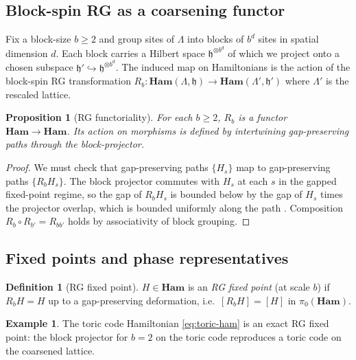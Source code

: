 \documentclass[12pt]{article}
\theoremstyle{plain}
\newtheorem{proposition}[theorem]{Proposition}
\theoremstyle{definition}
\newtheorem{definition}[theorem]{Definition}
\newtheorem{example}[theorem]{Example}
\theoremstyle{remark}
\newcommand{\Ham}{\mathbf{Ham}}
\begin{document}
\subsection{Block-spin RG as a coarsening functor}

Fix a block-size $b\geq 2$ and group sites of $\Lambda$ into blocks of $b^{d}$ sites in
spatial dimension $d$. Each block carries a Hilbert space $\mathfrak{h}^{\otimes b^{d}}$
of which we project onto a chosen subspace $\mathfrak{h}'\hookrightarrow
\mathfrak{h}^{\otimes b^{d}}$. The induced map on Hamiltonians is the action of the
block-spin RG transformation $R_{b}:\Ham(\Lambda,\mathfrak{h})\to\Ham(\Lambda',
\mathfrak{h}')$ where $\Lambda'$ is the rescaled lattice.

\begin{proposition}[RG functoriality]
\label{prop:rg-functor}
For each $b\geq 2$, $R_{b}$ is a functor $\Ham\to\Ham$. Its action on morphisms is
defined by intertwining gap-preserving paths through the block-projector.
\end{proposition}

\begin{proof}
We must check that gap-preserving paths $\{H_{s}\}$ map to gap-preserving paths
$\{R_{b}H_{s}\}$. The block projector commutes with $H_{s}$ at each $s$ in the gapped
fixed-point regime, so the gap of $R_{b}H_{s}$ is bounded below by the gap of $H_{s}$
times the projector overlap, which is bounded uniformly along the path \cite{Wilson1983}.
Composition $R_{b}\circ R_{b'}=R_{bb'}$ holds by associativity of block grouping.
\end{proof}

\subsection{Fixed points and phase representatives}

\begin{definition}[RG fixed point]
\label{def:rg-fixed}
$H\in\Ham$ is an \emph{RG fixed point} (at scale $b$) if $R_{b}H = H$ up to a
gap-preserving deformation, i.e.\ $[R_{b}H]=[H]$ in $\pi_{0}(\Ham)$.
\end{definition}

\begin{example}
The toric code Hamiltonian \cref{eq:toric-ham} is an exact RG fixed point: the block
projector for $b=2$ on the toric code reproduces a toric code on the coarsened lattice.
\end{example}
\end{document}
